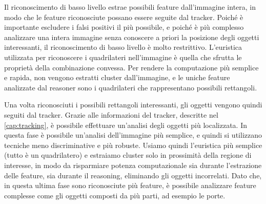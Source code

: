 Il riconoscimento di basso livello estrae possibili feature dall'immagine intera, in modo che le feature riconosciute possano essere seguite dal tracker. Poiché è importante escludere i falsi positivi il più possibile, e poiché è più complesso analizzare una intera immagine senza conoscere a priori la posizione degli oggetti interessanti, il riconoscimento di basso livello è molto restrittivo. L'euristica utilizzata per riconoscere i quadrilateri nell'immagine è quella che sfrutta le proprietà della combinazione convessa.
Per rendere la computazione più semplice e rapida, non vengono estratti cluster dall'immagine, e le uniche feature analizzate dal reasoner sono i quadrilateri che rappresentano possibili rettangoli.

Una volta riconosciuti i possibili rettangoli interessanti, gli oggetti vengono quindi seguiti dal tracker. Grazie alle informazioni del tracker, descritte nel \autoref{cap:tracking}, è possibile effettuare un'analisi degli oggetti più localizzata. In questa fase è possibile un'analisi dell'immagine più semplice, e quindi si utilizzano tecniche meno discriminative e più robuste. Usiamo quindi l'euristica più semplice (tutto è un quadrilatero) e estraiamo cluster solo in prossimità della regione di interesse, in modo da risparmiare potenza computazionale sia durante l'estrazione delle feature, sia durante il reasoning, eliminando gli oggetti incorrelati. Dato che, in questa ultima fase sono riconosciute più feature, è possibile analizzare feature complesse come gli oggetti composti da più parti, ad esempio le porte.


